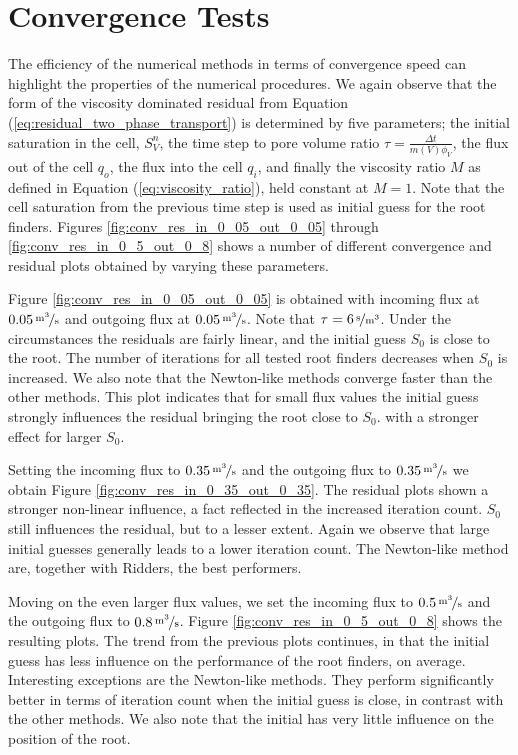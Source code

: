 \section{Convergence Tests}
\label{section:numerical_results_convergence_tests}
The efficiency of the numerical methods in terms of convergence speed can highlight the properties of the numerical procedures. We again  observe that the form of the viscosity dominated residual from Equation (\ref{eq:residual_two_phase_transport}) is determined by five parameters; the initial saturation in the cell, $S_V^{n}$, the time step to pore volume ratio $\tau = \frac{\Delta t}{m(V)\phi_V}$, the flux out of the cell $q_o$, the flux into the cell $q_i$, and finally the viscosity ratio $M$ as defined in Equation (\ref{eq:viscosity_ratio}), held constant at $M = 1$. Note that the cell saturation from the previous time step is used as initial guess for the root finders. Figures \ref{fig:conv_res_in_0_05_out_0_05} through \ref{fig:conv_res_in_0_5_out_0_8} shows a number of different convergence and residual plots obtained by varying these parameters. 

Figure \ref{fig:conv_res_in_0_05_out_0_05} is obtained with incoming flux at $\unitfrac[0.05]{m^3}{s}$ and outgoing flux at $\unitfrac[0.05]{m^3}{s}$. Note that $\tau = \unitfrac[6]{s}{m^3}$. Under the circumstances the residuals are fairly linear, and the initial guess $S_0$ is close to the root. The number of iterations for all tested root finders decreases when $S_0$ is increased. We also note that the Newton-like methods converge faster than the other methods. This plot indicates that for small flux values the initial guess strongly influences the residual bringing the root close to $S_0$. with a stronger effect for larger $S_0$. 

Setting the incoming flux to $\unitfrac[0.35]{m^3}{s}$ and the outgoing flux to $\unitfrac[0.35]{m^3}{s}$ we obtain Figure \ref{fig:conv_res_in_0_35_out_0_35}. The residual plots shown a stronger non-linear influence, a fact reflected in the increased iteration count. $S_0$ still influences the residual, but to a lesser extent. Again we observe that large initial guesses generally leads to a lower iteration count. The Newton-like method are, together with Ridders, the best performers.

Moving on the even larger flux values, we set the incoming flux to $\unitfrac[0.5]{m^3}{s}$ and the outgoing flux to $\unitfrac[0.8]{m^3}{s}$. Figure \ref{fig:conv_res_in_0_5_out_0_8} shows the resulting plots. The trend from the previous plots continues, in that the initial guess has less influence on the performance of the root finders, on average. Interesting exceptions are the Newton-like methods. They perform significantly better in terms of iteration count when the initial guess is close, in contrast with the other methods. We also note that the initial has very little influence on the position of the root.




